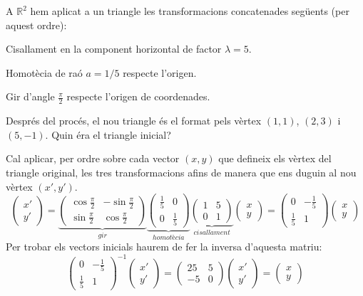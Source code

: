  \Exercise A $\mathbb{R}^2$ hem aplicat a un triangle les transformacions concatenades següents (per aquest ordre):
  \begin{llista}
    \item Cisallament en la component horizontal de factor $\lambda=5$.
    \item Homotècia de raó $a=1/5$ respecte l'origen.
    \item Gir d'angle $\frac{\pi}{2}$ respecte l'origen de coordenades.
  \end{llista}
  Després del procés, el nou triangle és el format pels vèrtex $(1,1)$, $(2,3)$ i $(5,-1)$. Quin éra el triangle inicial?

  \Answer Cal aplicar, per ordre sobre cada vector $(x,y)$ que defineix els vèrtex del triangle original, les tres transformacions afins de manera que ens duguin al nou vèrtex $(x',y')$.
  \[
    \begin{pmatrix}x'\\y'\end{pmatrix}=
    \underbrace{\begin{pmatrix}\cos{\frac{\pi}{2}} & -\sin{\frac{\pi}{2}}\\\sin{\frac{\pi}{2}}&\cos{\frac{\pi}{2}}\end{pmatrix}}_{gir}
    \underbrace{\begin{pmatrix}\frac{1}{5} &0\\0&\frac{1}{5}\end{pmatrix}}_{homotècia}
    \underbrace{\begin{pmatrix}1&5\\0&1\end{pmatrix}}_{cisallament}
    \begin{pmatrix}x\\y\end{pmatrix}=
    \begin{pmatrix}0&-\frac{1}{5}\\\frac{1}{5}&1\end{pmatrix}
    \begin{pmatrix}x\\y\end{pmatrix}
  \]
  Per trobar els vectors inicials haurem de fer la inversa d'aquesta matriu:
  \[
    \begin{pmatrix}0&-\frac{1}{5}\\\frac{1}{5}&1\end{pmatrix}^{-1}\begin{pmatrix}x'\\y'\end{pmatrix}=
    \begin{pmatrix}25&5\\-5&0\end{pmatrix}\begin{pmatrix}x'\\y'\end{pmatrix}=
    \begin{pmatrix}x\\y\end{pmatrix}
  \]
